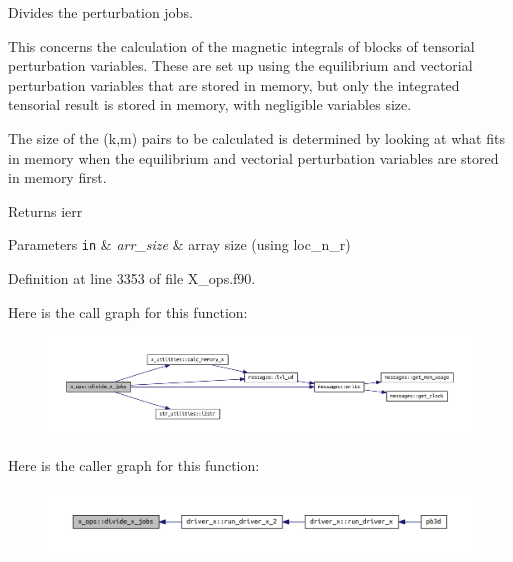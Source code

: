 Divides the perturbation jobs. 

This concerns the calculation of the magnetic integrals of blocks of tensorial perturbation variables. These are set up using the equilibrium and vectorial perturbation variables that are stored in memory, but only the integrated tensorial result is stored in memory, with negligible variables size.

The size of the (k,m) pairs to be calculated is determined by looking at what fits in memory when the equilibrium and vectorial perturbation variables are stored in memory first.

\begin{DoxyReturn}{Returns}
ierr
\end{DoxyReturn}

\begin{DoxyParams}[1]{Parameters}
\mbox{\tt in}  & {\em arr\+\_\+size} & array size (using loc\+\_\+n\+\_\+r) \\
\hline
\end{DoxyParams}


Definition at line 3353 of file X\+\_\+ops.\+f90.

Here is the call graph for this function\+:\nopagebreak
\begin{figure}[H]
\begin{center}
\leavevmode
\includegraphics[width=350pt]{namespacex__ops_a677c88d85fe1bfbf3579a2421ce16f2f_cgraph}
\end{center}
\end{figure}
Here is the caller graph for this function\+:\nopagebreak
\begin{figure}[H]
\begin{center}
\leavevmode
\includegraphics[width=350pt]{namespacex__ops_a677c88d85fe1bfbf3579a2421ce16f2f_icgraph}
\end{center}
\end{figure}
\mbox{\label{namespacex__ops_a73a80c582379669f8e07b09dd7456878}} 
